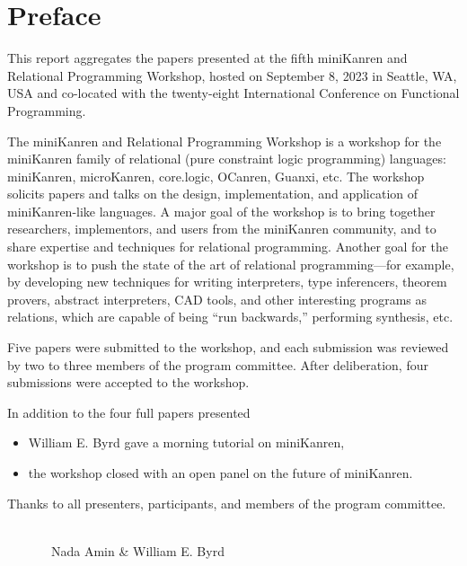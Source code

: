 \documentclass[a4paper]{book}
\date{September 8, 2019}
\author{Nada Amin \and William E. Byrd}
\begin{document}
\frontmatter
\setcounter{page}{3}  %
\chapter*{Preface}
This report aggregates the papers presented at the fifth miniKanren
and Relational Programming Workshop, hosted on September 8, 2023 in
Seattle, WA, USA and co-located with the twenty-eight International
Conference on Functional Programming.

\vspace{5pt}
\noindent
The miniKanren and Relational Programming Workshop is a workshop for the miniKanren family of relational (pure constraint logic programming) languages: miniKanren, microKanren, core.logic, OCanren, Guanxi, etc. The workshop solicits papers and talks on the design, implementation, and application of miniKanren-like languages. A major goal of the workshop is to bring together researchers, implementors, and users from the miniKanren community, and to share expertise and techniques for relational programming. Another goal for the workshop is to push the state of the art of relational programming—for example, by developing new techniques for writing interpreters, type inferencers, theorem provers, abstract interpreters, CAD tools, and other interesting programs as relations, which are capable of being “run backwards,” performing synthesis, etc.

\vspace{5pt}
\noindent
Five papers were submitted to the workshop, and each submission was reviewed by
two to three members of the program committee.  After deliberation, four submissions were accepted to the workshop.

\vspace{5pt}
\noindent
In addition to the four full papers presented
\begin{itemize}
\item William E. Byrd gave a morning tutorial on miniKanren,
\item the workshop closed with an open panel on the future of miniKanren.
\end{itemize}

\vspace{5pt}
\noindent
Thanks to all presenters, participants, and members of the
program committee.

\ \\

\ \ \ \ \ \ \ Nada Amin \& William E. Byrd
\end{document}
